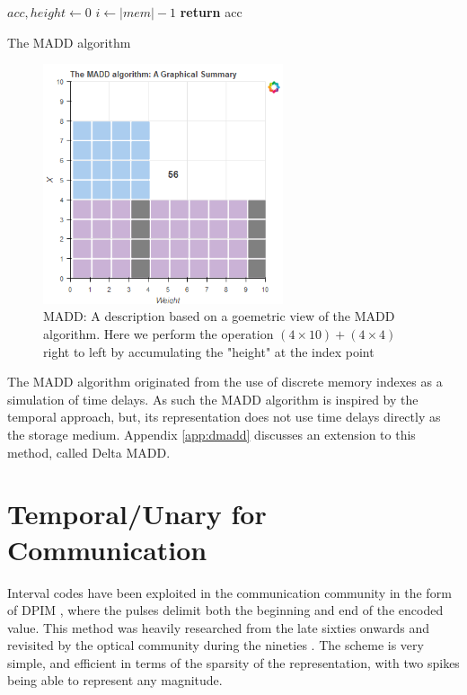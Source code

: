 \documentclass{article}
\begin{document}
\begin{algorithm}
$acc,height \gets 0$\;
$i \gets |mem|-1$\;
\textbf{return} acc 
\caption{The MADD algorithm} \label{madd}
\end{algorithm}

\begin{figure}[ht]
  \centerline{\includegraphics[width=200pt]{figures/rId37.png}}
  \caption{MADD: A description based on a goemetric view of the MADD algorithm. Here we perform the operation $(4 \times 10)+(4 \times 4)$ right to left by accumulating the "height" at the index point}\label{fig:madd}
\end{figure}

The MADD algorithm originated from the use of discrete memory indexes as a simulation of time delays. As such the MADD algorithm is inspired by the temporal approach, but, its representation does not use time delays directly as the storage medium. Appendix \ref{app:dmadd} discusses an extension to this method, called Delta MADD.

\section{Temporal/Unary for Communication}\label{coms}

Interval codes have been exploited in the communication community in the form of DPIM \cite{Das1967PulseintervalM}, where the pulses delimit both the beginning and end of the encoded value. This method was heavily researched from the late sixties onwards \cite{marougi1983signal} \cite{kaluarachchi1997digital} \cite{sato1978pulse} and revisited by the optical community during the nineties \cite{ghassemlooy1998digital} \cite{ghassemlooy2000digital}. The scheme is very simple, and efficient in terms of the sparsity of the representation, with two spikes being able to represent any magnitude.
\end{document}
